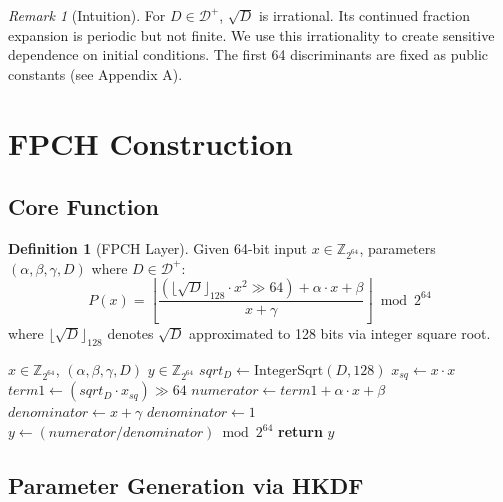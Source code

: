 \documentclass[11pt,a4paper]{article}
\theoremstyle{plain}
\theoremstyle{definition}
\newtheorem{definition}{Definition}[section]
\theoremstyle{remark}
\newtheorem{remark}{Remark}[section]
\begin{document}
\begin{remark}[Intuition]
For $D \in \mathcal{D}^+$, $\sqrt{D}$ is irrational. Its continued fraction expansion is periodic but not finite. We use this irrationality to create sensitive dependence on initial conditions. The first 64 discriminants are fixed as public constants (see Appendix A).
\end{remark}

\section{FPCH Construction}

\subsection{Core Function}

\begin{definition}[FPCH Layer]\label{def:fpch}
Given 64-bit input $x \in \mathbb{Z}_{2^{64}}$, parameters $(\alpha, \beta, \gamma, D)$ where $D \in \mathcal{D}^+$:
\begin{equation}
P(x) = \left\lfloor \frac{(\lfloor\sqrt{D}\rfloor_{128} \cdot x^2 \gg 64) + \alpha \cdot x + \beta}{x + \gamma} \right\rfloor \bmod 2^{64}
\end{equation}
where $\lfloor\sqrt{D}\rfloor_{128}$ denotes $\sqrt{D}$ approximated to 128 bits via integer square root.
\end{definition}

\begin{algorithm}[H]
\caption{FPCH Single Layer (Integer Arithmetic)}
\begin{algorithmic}[1]
\Require $x \in \mathbb{Z}_{2^{64}}$, $(\alpha, \beta, \gamma, D)$
\Ensure $y \in \mathbb{Z}_{2^{64}}$
\State $sqrt_D \gets \text{IntegerSqrt}(D, 128)$
\State $x_{sq} \gets x \cdot x$
\State $term1 \gets (sqrt_D \cdot x_{sq}) \gg 64$
\State $numerator \gets term1 + \alpha \cdot x + \beta$
\State $denominator \gets x + \gamma$
    \State $denominator \gets 1$
\EndIf
\State $y \gets (numerator / denominator) \bmod 2^{64}$
\State \textbf{return} $y$
\end{algorithmic}
\end{algorithm}

\subsection{Parameter Generation via HKDF}
\end{document}

